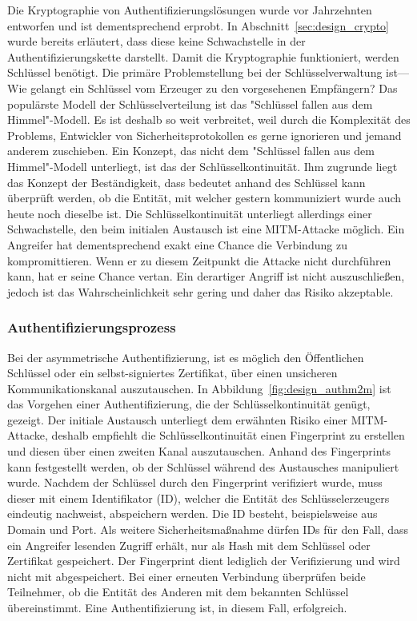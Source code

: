 \documentclass[11pt,a4paper]{report}
\begin{document}
Die Kryptographie von Authentifizierungslösungen wurde vor Jahrzehnten entworfen und ist dementsprechend erprobt. In Abschnitt~\ref{sec:design_crypto} wurde bereits erläutert, dass diese keine Schwachstelle in der Authentifizierungskette darstellt. Damit die Kryptographie funktioniert, werden Schlüssel benötigt. Die primäre Problemstellung bei der Schlüsselverwaltung ist---Wie gelangt ein Schlüssel vom Erzeuger zu den vorgesehenen Empfängern? Das populärste Modell der Schlüsselverteilung ist das "Schlüssel fallen aus dem Himmel"-Modell. Es ist deshalb so weit verbreitet, weil durch die Komplexität des Problems, Entwickler von Sicherheitsprotokollen es gerne ignorieren und jemand anderem zuschieben. Ein Konzept, das nicht dem "Schlüssel fallen aus dem Himmel"-Modell unterliegt, ist das der Schlüsselkontinuität. Ihm zugrunde liegt das Konzept der Beständigkeit, dass bedeutet anhand des Schlüssel kann überprüft werden, ob die Entität, mit welcher gestern kommuniziert wurde auch heute noch dieselbe ist. Die Schlüsselkontinuität unterliegt allerdings einer Schwachstelle, den beim initialen Austausch ist eine MITM-Attacke möglich. Ein Angreifer hat dementsprechend exakt eine Chance die Verbindung zu kompromittieren. Wenn er zu diesem Zeitpunkt die Attacke nicht durchführen kann, hat er seine Chance vertan. Ein derartiger Angriff ist nicht auszuschließen, jedoch ist das Wahrscheinlichkeit sehr gering und daher das Risiko akzeptable.

\subsubsection{Authentifizierungsprozess}

Bei der asymmetrische Authentifizierung, ist es möglich den Öffentlichen Schlüssel oder ein selbst-signiertes Zertifikat, über einen unsicheren Kommunikationskanal auszutauschen. In Abbildung~\ref{fig:design_authm2m} ist das Vorgehen einer Authentifizierung, die der Schlüsselkontinuität genügt, gezeigt. Der initiale Austausch unterliegt dem erwähnten Risiko einer MITM-Attacke, deshalb empfiehlt die Schlüsselkontinuität einen Fingerprint zu erstellen und diesen über einen zweiten Kanal auszutauschen. Anhand des Fingerprints kann festgestellt  werden, ob der Schlüssel während des Austausches manipuliert wurde. Nachdem der Schlüssel durch den Fingerprint verifiziert wurde, muss dieser mit einem Identifikator (ID), welcher die Entität des Schlüsselerzeugers eindeutig nachweist, abspeichern werden. Die ID besteht, beispielsweise aus Domain und Port. Als weitere Sicherheitsmaßnahme dürfen IDs für den Fall, dass ein Angreifer lesenden Zugriff erhält, nur als Hash mit dem Schlüssel oder Zertifikat gespeichert. Der Fingerprint dient lediglich der Verifizierung und wird nicht mit abgespeichert.
Bei einer erneuten Verbindung überprüfen beide Teilnehmer, ob die Entität des Anderen mit dem bekannten Schlüssel übereinstimmt. Eine Authentifizierung ist, in diesem Fall, erfolgreich. 
\end{document}
